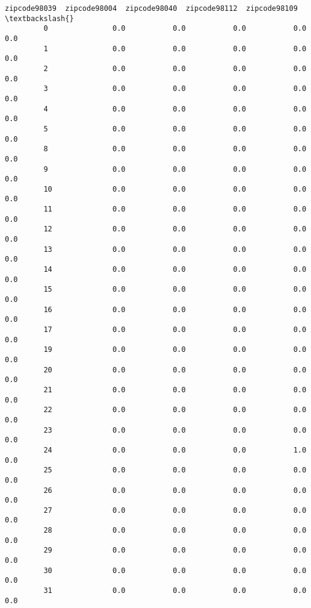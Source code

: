 \documentclass[11pt]{article}
\begin{document}
\begin{Verbatim}[commandchars=\\\{\}]
                zipcode98039  zipcode98004  zipcode98040  zipcode98112  zipcode98109  \textbackslash{}
         0               0.0           0.0           0.0           0.0           0.0   
         1               0.0           0.0           0.0           0.0           0.0   
         2               0.0           0.0           0.0           0.0           0.0   
         3               0.0           0.0           0.0           0.0           0.0   
         4               0.0           0.0           0.0           0.0           0.0   
         5               0.0           0.0           0.0           0.0           0.0   
         8               0.0           0.0           0.0           0.0           0.0   
         9               0.0           0.0           0.0           0.0           0.0   
         10              0.0           0.0           0.0           0.0           0.0   
         11              0.0           0.0           0.0           0.0           0.0   
         12              0.0           0.0           0.0           0.0           0.0   
         13              0.0           0.0           0.0           0.0           0.0   
         14              0.0           0.0           0.0           0.0           0.0   
         15              0.0           0.0           0.0           0.0           0.0   
         16              0.0           0.0           0.0           0.0           0.0   
         17              0.0           0.0           0.0           0.0           0.0   
         19              0.0           0.0           0.0           0.0           0.0   
         20              0.0           0.0           0.0           0.0           0.0   
         21              0.0           0.0           0.0           0.0           0.0   
         22              0.0           0.0           0.0           0.0           0.0   
         23              0.0           0.0           0.0           0.0           0.0   
         24              0.0           0.0           0.0           1.0           0.0   
         25              0.0           0.0           0.0           0.0           0.0   
         26              0.0           0.0           0.0           0.0           0.0   
         27              0.0           0.0           0.0           0.0           0.0   
         28              0.0           0.0           0.0           0.0           0.0   
         29              0.0           0.0           0.0           0.0           0.0   
         30              0.0           0.0           0.0           0.0           0.0   
         31              0.0           0.0           0.0           0.0           0.0   

\end{Verbatim}
\end{document}
